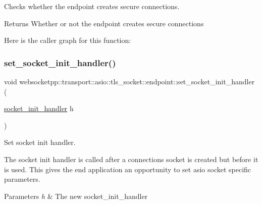 Checks whether the endpoint creates secure connections. 

\begin{DoxyReturn}{Returns}
Whether or not the endpoint creates secure connections 
\end{DoxyReturn}
Here is the caller graph for this function\+:
\mbox{\label{classwebsocketpp_1_1transport_1_1asio_1_1tls__socket_1_1endpoint_ae9466b3c3169eb1757ca64a1462ac86e}} 
\subsubsection{\texorpdfstring{set\+\_\+socket\+\_\+init\+\_\+handler()}{set\_socket\_init\_handler()}}
{\footnotesize\ttfamily void websocketpp\+::transport\+::asio\+::tls\+\_\+socket\+::endpoint\+::set\+\_\+socket\+\_\+init\+\_\+handler (\begin{DoxyParamCaption}\item[{\mbox{\hyperlink{namespacewebsocketpp_1_1transport_1_1asio_1_1tls__socket_a0ec24de8bf054a4bc6f6c018e743efea}{socket\+\_\+init\+\_\+handler}}}]{h }\end{DoxyParamCaption})\hspace{0.3cm}{\ttfamily [inline]}}



Set socket init handler. 

The socket init handler is called after a connection\textquotesingle{}s socket is created but before it is used. This gives the end application an opportunity to set asio socket specific parameters.


\begin{DoxyParams}{Parameters}
{\em h} & The new socket\+\_\+init\+\_\+handler \\
\hline
\end{DoxyParams}
\mbox{\label{classwebsocketpp_1_1transport_1_1asio_1_1tls__socket_1_1endpoint_aaa8973ceabe2423f535f6cfd2f7cbd53}} 
